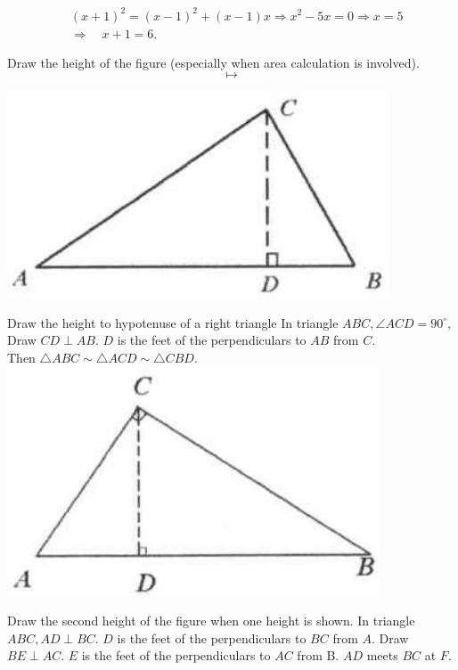 \documentclass{article}
\begin{document}
\[
\begin{aligned}
& (x+1)^{2}=(x-1)^{2}+(x-1) x \Rightarrow x^{2}-5 x=0 \Rightarrow x=5 \\
& \Rightarrow \quad x+1=6 .
\end{aligned}
\]

Draw the height of the figure (especially when area calculation is involved).
\[
\longmapsto
\]

\begin{center}
\includegraphics[width=\textwidth]{images/074.jpg}
\end{center}

Draw the height to hypotenuse of a right triangle
In triangle \(A B C, \angle A C D=90^{\circ}\), Draw \(C D \perp A B\). \(D\) is the feet of the perpendiculars to \(A B\) from \(C\).\\
Then \(\triangle A B C \sim \triangle A C D \sim \triangle C B D\).\\
\centering
\includegraphics[width=\textwidth]{images/074(1).jpg}

Draw the second height of the figure when one height is shown.
In triangle \(A B C, A D \perp B C\). \(D\) is the feet of the perpendiculars to \(B C\) from \(A\). Draw \(B E \perp A C\). \(E\) is the feet of the perpendiculars to \(A C\) from B. \(A D\) meets \(B C\) at \(F\).
\end{document}
